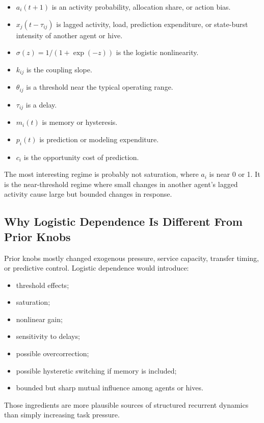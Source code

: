 \documentclass[11pt]{article}
\begin{document}
\begin{itemize}
\item $a_i(t+1)$ is an activity probability, allocation share, or action bias.
\item $x_j(t-\tau_{ij})$ is lagged activity, load, prediction expenditure, or
state-burst intensity of another agent or hive.
\item $\sigma(z)=1/(1+\exp(-z))$ is the logistic nonlinearity.
\item $k_{ij}$ is the coupling slope.
\item $\theta_{ij}$ is a threshold near the typical operating range.
\item $\tau_{ij}$ is a delay.
\item $m_i(t)$ is memory or hysteresis.
\item $p_i(t)$ is prediction or modeling expenditure.
\item $c_i$ is the opportunity cost of prediction.
\end{itemize}

The most interesting regime is probably not saturation, where $a_i$ is near 0
or 1. It is the near-threshold regime where small changes in another agent's
lagged activity cause large but bounded changes in response.

\subsection{Why Logistic Dependence Is Different From Prior Knobs}

Prior knobs mostly changed exogenous pressure, service capacity, transfer
timing, or predictive control. Logistic dependence would introduce:

\begin{itemize}
\item threshold effects;
\item saturation;
\item nonlinear gain;
\item sensitivity to delays;
\item possible overcorrection;
\item possible hysteretic switching if memory is included;
\item bounded but sharp mutual influence among agents or hives.
\end{itemize}

Those ingredients are more plausible sources of structured recurrent dynamics
than simply increasing task pressure.
\end{document}
